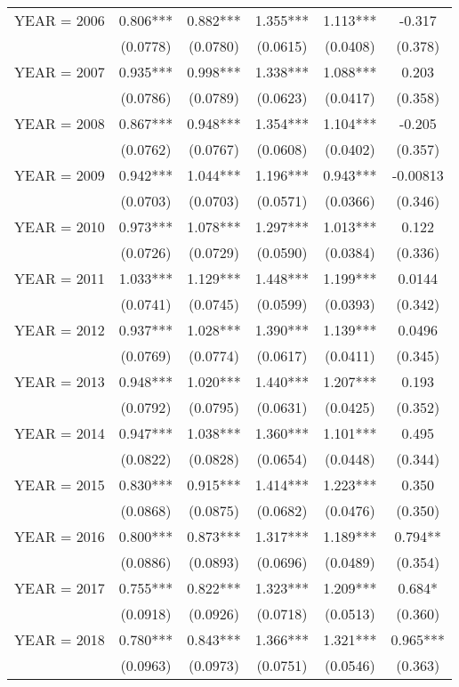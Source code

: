 \begin{tabular}{lccccc}
YEAR = 2006 & 0.806*** & 0.882*** & 1.355*** & 1.113*** & -0.317 \\
 & (0.0778) & (0.0780) & (0.0615) & (0.0408) & (0.378) \\
YEAR = 2007 & 0.935*** & 0.998*** & 1.338*** & 1.088*** & 0.203 \\
 & (0.0786) & (0.0789) & (0.0623) & (0.0417) & (0.358) \\
YEAR = 2008 & 0.867*** & 0.948*** & 1.354*** & 1.104*** & -0.205 \\
 & (0.0762) & (0.0767) & (0.0608) & (0.0402) & (0.357) \\
YEAR = 2009 & 0.942*** & 1.044*** & 1.196*** & 0.943*** & -0.00813 \\
 & (0.0703) & (0.0703) & (0.0571) & (0.0366) & (0.346) \\
YEAR = 2010 & 0.973*** & 1.078*** & 1.297*** & 1.013*** & 0.122 \\
 & (0.0726) & (0.0729) & (0.0590) & (0.0384) & (0.336) \\
YEAR = 2011 & 1.033*** & 1.129*** & 1.448*** & 1.199*** & 0.0144 \\
 & (0.0741) & (0.0745) & (0.0599) & (0.0393) & (0.342) \\
YEAR = 2012 & 0.937*** & 1.028*** & 1.390*** & 1.139*** & 0.0496 \\
 & (0.0769) & (0.0774) & (0.0617) & (0.0411) & (0.345) \\
YEAR = 2013 & 0.948*** & 1.020*** & 1.440*** & 1.207*** & 0.193 \\
 & (0.0792) & (0.0795) & (0.0631) & (0.0425) & (0.352) \\
YEAR = 2014 & 0.947*** & 1.038*** & 1.360*** & 1.101*** & 0.495 \\
 & (0.0822) & (0.0828) & (0.0654) & (0.0448) & (0.344) \\
YEAR = 2015 & 0.830*** & 0.915*** & 1.414*** & 1.223*** & 0.350 \\
 & (0.0868) & (0.0875) & (0.0682) & (0.0476) & (0.350) \\
YEAR = 2016 & 0.800*** & 0.873*** & 1.317*** & 1.189*** & 0.794** \\
 & (0.0886) & (0.0893) & (0.0696) & (0.0489) & (0.354) \\
YEAR = 2017 & 0.755*** & 0.822*** & 1.323*** & 1.209*** & 0.684* \\
 & (0.0918) & (0.0926) & (0.0718) & (0.0513) & (0.360) \\
YEAR = 2018 & 0.780*** & 0.843*** & 1.366*** & 1.321*** & 0.965*** \\
 & (0.0963) & (0.0973) & (0.0751) & (0.0546) & (0.363) \\

\end{tabular}
